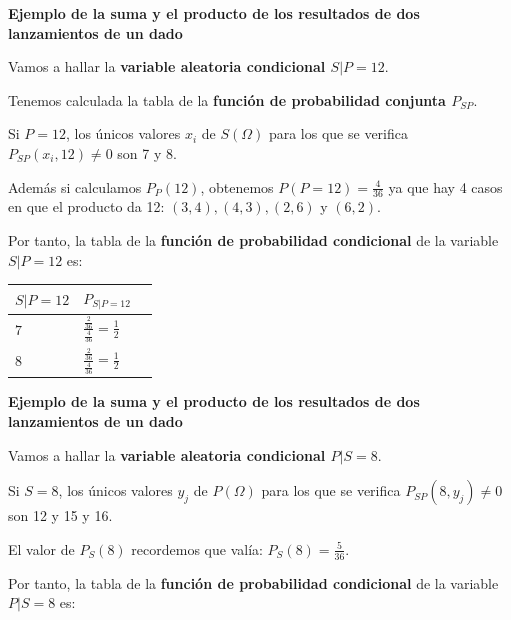 \documentclass[
  letterpaper,
  DIV=11,
  numbers=noendperiod]{scrreprt}
\begin{document}
\textbf{Ejemplo de la suma y el producto de los resultados de dos
lanzamientos de un dado}

Vamos a hallar la \textbf{variable aleatoria condicional \(S|P=12\)}.

Tenemos calculada la tabla de la \textbf{función de probabilidad
conjunta \(P_{SP}\)}.

Si \(P=12\), los únicos valores \(x_i\) de \(S(\Omega)\) para los que se
verifica \(P_{SP}(x_i,12)\neq 0\) son 7 y 8.

Además si calculamos \(P_P(12)\), obtenemos \(P(P=12)=\frac{4}{36}\) ya
que hay 4 casos en que el producto da 12: \((3,4), (4,3), (2,6)\) y
\((6,2)\).

Por tanto, la tabla de la \textbf{función de probabilidad condicional}
de la variable \(S|P=12\) es:

\begin{longtable}[]{@{}lll@{}}
\toprule\noalign{}
\(S|P=12\) & \(P_{S|P=12}\) & \\
\midrule\noalign{}
\endhead
\bottomrule\noalign{}
\endlastfoot
\(7\) & \(\frac{\frac{2}{36}}{\frac{4}{36}}=\frac{1}{2}\) & \\
\(8\) & \(\frac{\frac{2}{36}}{\frac{4}{36}}=\frac{1}{2}\) & \\
\end{longtable}

\textbf{Ejemplo de la suma y el producto de los resultados de dos
lanzamientos de un dado}

Vamos a hallar la \textbf{variable aleatoria condicional \(P|S=8\)}.

Si \(S=8\), los únicos valores \(y_j\) de \(P(\Omega)\) para los que se
verifica \(P_{SP}(8,y_j)\neq 0\) son 12 y 15 y 16.

El valor de \(P_S(8)\) recordemos que valía: \(P_S(8)=\frac{5}{36}\).

Por tanto, la tabla de la \textbf{función de probabilidad condicional}
de la variable \(P|S=8\) es:
\end{document}
